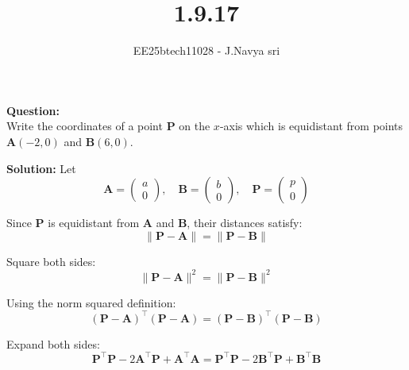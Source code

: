 \documentclass[journal]{IEEEtran}
\begin{document}

\vspace{3cm}

\title{1.9.17}
\author{EE25btech11028 - J.Navya sri}
{\let\newpage\relax\maketitle}



\textbf{Question:} \\
Write the coordinates of a point \(\mathbf{P}\) on the \(x\)-axis which is equidistant from points \(\mathbf{A}(-2,0)\) and \(\mathbf{B}(6,0)\).

\vspace{0.5cm}
\textbf{Solution:} Let
\begin{equation}
\mathbf{A} = \begin{pmatrix} a \\ 0 \end{pmatrix}, \quad
\mathbf{B} = \begin{pmatrix} b \\ 0 \end{pmatrix}, \quad
\mathbf{P} = \begin{pmatrix} p \\ 0 \end{pmatrix}
\end{equation}

Since \(\mathbf{P}\) is equidistant from \(\mathbf{A}\) and \(\mathbf{B}\), their distances satisfy:
\begin{equation}
\|\mathbf{P} - \mathbf{A}\| = \|\mathbf{P} - \mathbf{B}\|
\end{equation}

Square both sides:
\begin{equation}
\|\mathbf{P} - \mathbf{A}\|^2 = \|\mathbf{P} - \mathbf{B}\|^2
\end{equation}

Using the norm squared definition:
\begin{equation}
(\mathbf{P} - \mathbf{A})^\top (\mathbf{P} - \mathbf{A}) = (\mathbf{P} - \mathbf{B})^\top (\mathbf{P} - \mathbf{B})
\end{equation}

Expand both sides:
\begin{equation}
\mathbf{P}^\top \mathbf{P} - 2 \mathbf{A}^\top \mathbf{P} + \mathbf{A}^\top \mathbf{A} = \mathbf{P}^\top \mathbf{P} - 2 \mathbf{B}^\top \mathbf{P} + \mathbf{B}^\top \mathbf{B}
\end{equation}
\end{document}
